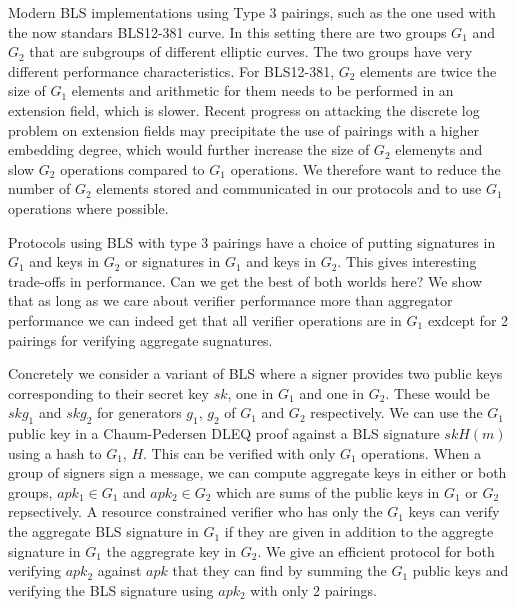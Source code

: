 \bigskip
\bigskip






Modern BLS implementations using Type 3 pairings, such as the one used with the  now standars BLS12-381 curve. In this setting there are two groups $G_1$ and $G_2$ that are subgroups of different elliptic curves. The two groups have very different performance characteristics. For BLS12-381, $G_2$ elements are twice the size of $G_1$ elements and arithmetic for them needs to be performed in an extension field, which is slower.  Recent progress on attacking the discrete log problem on extension fields may precipitate the use of pairings with a higher embedding degree, which would further increase the size of $G_2$ elemenyts and slow $G_2$ operations compared to $G_1$ operations. We therefore want to reduce the number of $G_2$ elements stored and communicated in our protocols and to use $G_1$ operations where possible.

Protocols using BLS with type 3 pairings have a choice of putting signatures in $G_1$ and keys in $G_2$ or signatures in $G_1$ and keys in $G_2$. This gives interesting trade-offs in performance. Can we get the best of both worlds here? We show that as long as we care about verifier performance more than aggregator performance we can indeed get that all verifier operations are in $G_1$ exdcept for 2 pairings for verifying aggregate sugnatures. 

Concretely we consider a variant of BLS where a signer provides two public keys corresponding to their secret key $sk$, one in $G_1$ and one in $G_2$. These would be $sk g_1$ and $sk g_2$ for generators $g_1$, $g_2$ of $G_1$ and $G_2$ respectively. We can use the $G_1$ public key in a Chaum-Pedersen DLEQ proof against a BLS signature $sk H(m)$ using a hash to $G_1$, $H$. This can be verified with only $G_1$ operations. When a group of signers sign a message, we can compute  aggregate keys in either or both groups, $apk_1 \in G_1$ and $apk_2 \in G_2$ which are sums of the public keys in $G_1$ or $G_2$ repsectively. A resource constrained verifier who has only the $G_1$ keys can verify the aggregate BLS signature in $G_1$ if they are given in addition to the aggregte signature in $G_1$ the aggregrate key in $G_2$. We give an efficient protocol for both verifying $apk_2$ against $apk$ that they can find by summing the $G_1$ public keys and verifying the BLS signature using $apk_2$ with only 2 pairings.


